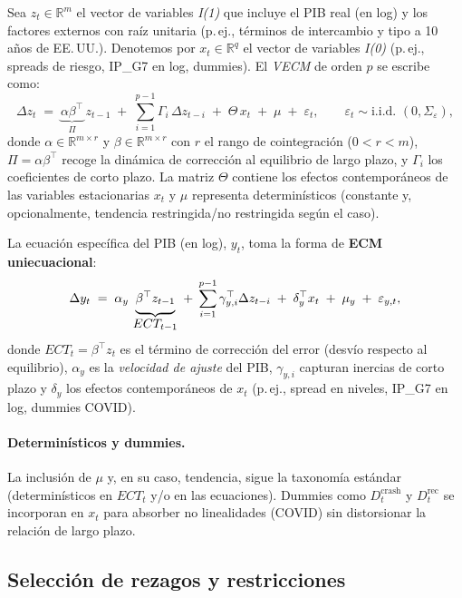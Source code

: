 \documentclass[11pt,a4paper]{article}
\newcommand{\1}{\mathbf{1}}
\begin{document}
Sea $z_t \in \mathbb{R}^{m}$ el vector de variables \emph{I(1)} que incluye el PIB real (en log) y los factores externos con raíz unitaria (p.\,ej., términos de intercambio y tipo a 10 años de EE.\,UU.). Denotemos por $x_t \in \mathbb{R}^{q}$ el vector de variables \emph{I(0)} (p.\,ej., spreads de riesgo, IP\_G7 en log, dummies). El \textit{VECM} de orden $p$ se escribe como:
\begin{equation}
\Delta z_t
\;=\;
\underbrace{\alpha \beta^\top}_{\Pi}\, z_{t-1}
\;+\;
\sum_{i=1}^{p-1} \Gamma_i\, \Delta z_{t-i}
\;+\;
\Theta\, x_t
\;+\;
\mu
\;+\;
\varepsilon_t,
\qquad
\varepsilon_t \sim \text{i.i.d. } (0,\Sigma_\varepsilon),
\label{eq:vecm_system}
\end{equation}
donde $\alpha \in \mathbb{R}^{m \times r}$ y $\beta \in \mathbb{R}^{m \times r}$ con $r$ el rango de cointegración ($0<r<m$), $\Pi=\alpha\beta^\top$ recoge la dinámica de corrección al equilibrio de largo plazo, y $\Gamma_i$ los coeficientes de corto plazo. La matriz $\Theta$ contiene los efectos contemporáneos de las variables estacionarias $x_t$ y $\mu$ representa determinísticos (constante y, opcionalmente, tendencia restringida/no restringida según el caso).

La ecuación específica del PIB (en log), $y_t$, toma la forma de \textbf{ECM uniecuacional}:
\begin{equation}
\Delta y_t
\;=\;
\alpha_y\, \underbrace{\vphantom{\sum}\beta^\top z_{t-1}}_{\displaystyle ECT_{t-1}}
\;+\;
\sum_{i=1}^{p-1} \gamma_{y,i}^\top \Delta z_{t-i}
\;+\;
\delta_y^\top x_t
\;+\;
\mu_y
\;+\;
\varepsilon_{y,t},
\label{eq:ecm_y}
\end{equation}
donde $ECT_{t}=\beta^\top z_t$ es el término de corrección del error (desvío respecto al equilibrio), $\alpha_y$ es la \emph{velocidad de ajuste} del PIB, $\gamma_{y,i}$ capturan inercias de corto plazo y $\delta_y$ los efectos contemporáneos de $x_t$ (p.\,ej., spread en niveles, IP\_G7 en log, dummies COVID).

\paragraph{Determinísticos y dummies.}
La inclusión de $\mu$ y, en su caso, tendencia, sigue la taxonomía estándar (determinísticos en $ECT_t$ y/o en las ecuaciones). Dummies como $D^{\text{crash}}_t$ y $D^{\text{rec}}_t$ se incorporan en $x_t$ para absorber no linealidades (COVID) sin distorsionar la relación de largo plazo.

\subsection{Selección de rezagos y restricciones}
\end{document}
